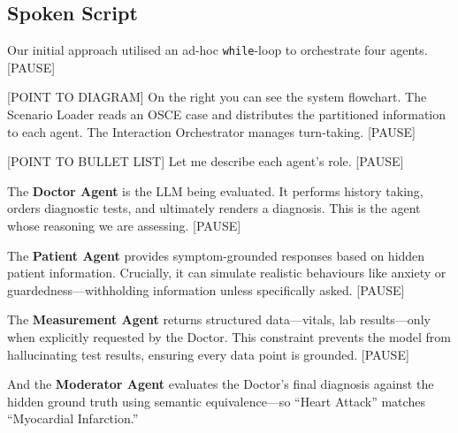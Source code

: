 \documentclass[12pt]{article}
\begin{document}
  \subsection*{Spoken Script}
  \begin{spokenbox}
   Our initial approach utilised an ad-hoc \texttt{while}-loop to orchestrate four agents. [PAUSE]

  [POINT TO DIAGRAM] On the right you can see the system flowchart. The Scenario Loader reads an OSCE case and distributes the partitioned information to each agent. The Interaction Orchestrator manages turn-taking. [PAUSE]

  [POINT TO BULLET LIST] Let me describe each agent's role. [PAUSE]

  The \textbf{Doctor Agent} is the LLM being evaluated. It performs history taking, orders diagnostic tests, and ultimately renders a diagnosis. This is the agent whose reasoning we are assessing. [PAUSE]

  The \textbf{Patient Agent} provides symptom-grounded responses based on hidden patient information. Crucially, it can simulate realistic behaviours like anxiety or guardedness---withholding information unless specifically asked. [PAUSE]

  The \textbf{Measurement Agent} returns structured data---vitals, lab results---only when explicitly requested by the Doctor. This constraint prevents the model from hallucinating test results, ensuring every data point is grounded. [PAUSE]

  And the \textbf{Moderator Agent} evaluates the Doctor's final diagnosis against the hidden ground truth using semantic equivalence---so ``Heart Attack'' matches ``Myocardial Infarction.''
  \end{spokenbox}
\end{document}
